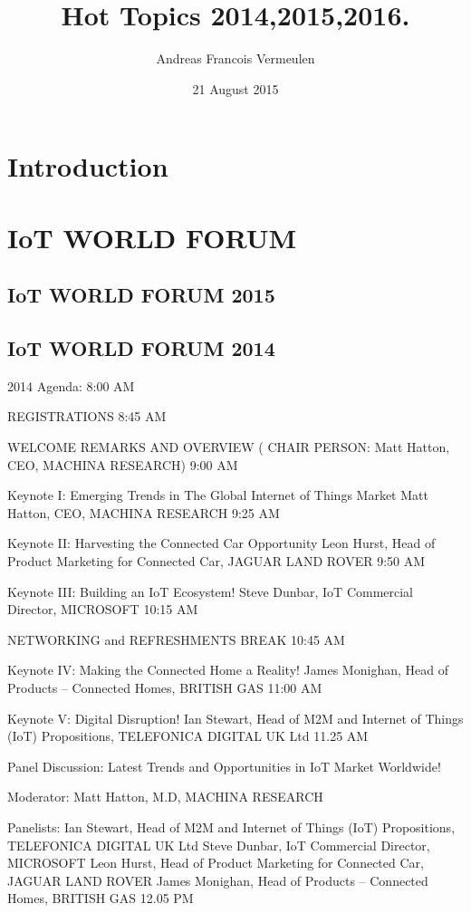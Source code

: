 \documentclass{report}
\begin{document}
\title{Hot Topics 2014,2015,2016.}
\author{Andreas Francois Vermeulen}
\date{21 August 2015}

\maketitle

\section{Introduction}
\section{IoT WORLD FORUM}
\subsection{IoT WORLD FORUM 2015}

\subsection{IoT WORLD FORUM 2014}
2014 Agenda:
8:00 AM
	
REGISTRATIONS
8:45 AM
	
WELCOME REMARKS AND OVERVIEW ( CHAIR PERSON: Matt Hatton, CEO, MACHINA RESEARCH)
9:00 AM
	
Keynote I: Emerging Trends in The Global Internet of Things Market 
Matt Hatton, CEO, MACHINA RESEARCH
9:25 AM
	
Keynote II:  Harvesting the Connected Car Opportunity   
Leon Hurst, Head of Product Marketing for Connected Car, JAGUAR LAND ROVER
9:50 AM
	
Keynote III:  Building an IoT Ecosystem! 
Steve Dunbar, IoT Commercial Director, MICROSOFT
10:15 AM
	
NETWORKING and  REFRESHMENTS BREAK
10:45 AM
	
Keynote IV: Making the Connected Home a Reality!
James Monighan, Head of Products – Connected Homes, BRITISH GAS
11:00 AM
	
Keynote V: Digital Disruption!
Ian Stewart, Head of M2M and  Internet of Things (IoT) Propositions, TELEFONICA DIGITAL UK Ltd
11.25 AM
	
Panel Discussion: Latest Trends and  Opportunities in IoT Market Worldwide! 
 
Moderator:
Matt Hatton, M.D, MACHINA RESEARCH
 
Panelists:
Ian Stewart, Head of M2M and  Internet of Things (IoT) Propositions, TELEFONICA DIGITAL UK Ltd
Steve Dunbar, IoT Commercial Director, MICROSOFT
Leon Hurst, Head of Product Marketing for Connected Car, JAGUAR LAND ROVER
James Monighan, Head of Products – Connected Homes, BRITISH GAS
12.05 PM
	
\end{document}
